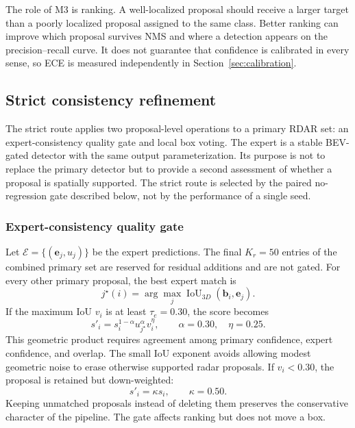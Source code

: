 \documentclass[final,5p,times]{elsarticle}
\begin{document}
The role of M3 is ranking. A well-localized proposal should receive a larger
target than a poorly localized proposal assigned to the same class. Better
ranking can improve which proposal survives NMS and where a detection appears
on the precision--recall curve. It does not guarantee that confidence is
calibrated in every sense, so ECE is measured independently in
Section~\ref{sec:calibration}.

\subsection{Strict consistency refinement}

The strict route applies two proposal-level operations to a primary RDAR set:
an expert-consistency quality gate and local box voting. The expert is a
stable BEV-gated detector with the same output parameterization. Its purpose is
not to replace the primary detector but to provide a second assessment of
whether a proposal is spatially supported. The strict route is selected by the
paired no-regression gate described below, not by the performance of a single
seed.

\subsubsection{Expert-consistency quality gate}

Let $\mathcal{E}=\{(\mathbf{e}_j,u_j)\}$ be the expert predictions. The final
$K_r=50$ entries of the combined primary set are reserved for residual
additions and are not gated. For every other primary proposal, the best expert
match is
\begin{equation}
j^\star(i)=\arg\max_j
\operatorname{IoU}_{3D}(\mathbf{b}_i,\mathbf{e}_j).
\end{equation}
If the maximum IoU $v_i$ is at least $\tau_e=0.30$, the score becomes
\begin{equation}
s'_i=s_i^{1-\alpha}u_{j^\star}^{\alpha}v_i^\eta,
\qquad \alpha=0.30,\quad \eta=0.25.
\label{eq:quality-gate}
\end{equation}
This geometric product requires agreement among primary confidence, expert
confidence, and overlap. The small IoU exponent avoids allowing modest
geometric noise to erase otherwise supported radar proposals. If $v_i<0.30$,
the proposal is retained but down-weighted:
\begin{equation}
s'_i=\kappa s_i,\qquad \kappa=0.50.
\end{equation}
Keeping unmatched proposals instead of deleting them preserves the conservative
character of the pipeline. The gate affects ranking but does not move a box.
\end{document}
